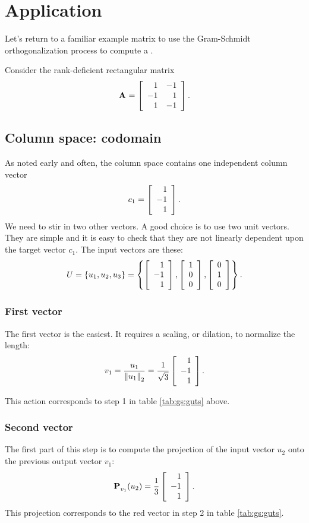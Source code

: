 \section{Application}
Let's return to a familiar example matrix to use the Gram-Schmidt orthogonalization process to compute a \svdl.

Consider the rank-deficient rectangular matrix
\begin{equation}
  \A{} = \Aexample.
\end{equation}

\subsection{Column space: codomain}
As noted early and often, the column space contains one independent column vector
\begin{equation}
  c_{1} = \mat{r}{1\\-1\\1}.
\end{equation}
We need to stir in two other vectors. A good choice is to use two unit vectors. They are simple and it is easy to check that they are not linearly dependent upon the target vector $c_{1}$. The input vectors are these:
\begin{equation}
  U = \lst{u_{1},u_{2},u_{3}} = \lst{
  \mat{r}{1\\-1\\1},
  \mat{r}{1\\0\\0},
  \mat{r}{0\\1\\0}
  }.
\end{equation}

\subsubsection{First vector}
The first vector is the easiest. It requires a scaling, or dilation, to normalize the length:
\begin{equation}
  v_{1} = \frac{u_{1}}{\normt{u_{1}}} = \sthree
  \mat{r}{1\\-1\\1}.
\end{equation}

This action corresponds to step 1 in table \eqref{tab:gs:guts} above.

\subsubsection{Second vector}
The first part of this step is to compute the projection of the input vector $u_{2}$ onto the previous output vector $v_{1}$:
\begin{equation}
  \pee{}_{v_{1}}(u_{2}) = \rthree\mat{r}{1\\-1\\1}.
\end{equation}
This projection corresponds to the red vector in step 2 in table \eqref{tab:gs:guts}.

